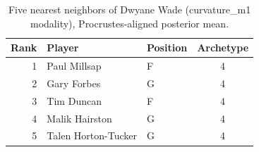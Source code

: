 \begin{table}[htbp]
  \centering\small
  \begin{tabular}{rllc}
    \toprule
    Rank & Player & Position & Archetype \\
    \midrule
    1 & Paul Millsap & F & 4 \\
    2 & Gary Forbes & G & 4 \\
    3 & Tim Duncan & F & 4 \\
    4 & Malik Hairston & G & 4 \\
    5 & Talen Horton-Tucker & G & 4 \\
    \bottomrule
  \end{tabular}
  \caption{Five nearest neighbors of Dwyane Wade (curvature_m1 modality), Procrustes-aligned posterior mean.}
  \label{tab:Dwyane_Wade_neighbors_curvature_m1}
\end{table}

